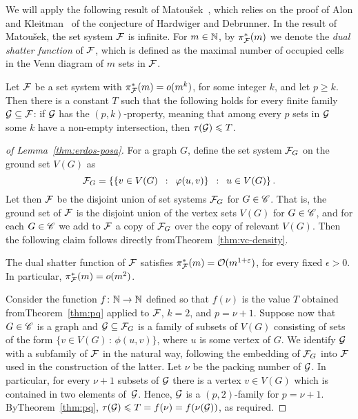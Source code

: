 We will apply the following result of Matou{\v s}ek~\cite{Matousek:2004:BVI:1005787.1005789},
which relies on the proof of Alon and Kleitman~\cite{ALON1992103} of the conjecture of Hardwiger and Debrunner. 
In the result of Matou{\v s}ek, the set system $\cal F$ is infinite. For $m\in \N$, by $\pi_{\cal F}^*(m)$ we denote the \emph{dual shatter function} of $\cal F$, which is defined as the maximal number 
of occupied cells in the Venn diagram of $m$ sets in $\cal F$.


\begin{theorem}\label{thm:pq}
	Let $\cal F$ be a set system with $\pi^*_{\cal F}(m)=o(m^k)$,
	for some integer $k$, and let $p\ge k$.
	Then there is a constant $T$ such that the following holds for every finite family $\cal G\subset \cal F$: 
	if $\cal G$ has the $(p,k)$-property, meaning that 
	among every $p$ sets in $\cal G$ some $k$ have a non-empty intersection, then $\tau ({\cal G})\le T$.
\end{theorem}
\begin{proof}[of Lemma~\ref{thm:erdos-posa}]
For a graph $G$, define the set system ${\cal F}_G$ on the ground set $V(G)$ as
$${\cal F}_G = \setof{\setof{v\in V(G)}{\phi(u, v)}}{u\in V(G)}.$$
Let then $\cal F$ be the disjoint union of set systems ${\cal F}_G$ for $G\in \CCC$. That is, 
the ground set of $\cal F$ is the disjoint union of the vertex sets $V(G)$ for $G\in \CCC$, and for each $G\in \CCC$ we add to ${\cal F}$
a copy of ${\cal F}_G$ over the copy of relevant $V(G)$.
Then the following claim follows directly fromTheorem~\ref{thm:vc-density}.

\begin{claim}
The dual shatter function of $\cal F$ satisfies $\pi^*_{\cal F}(m)=\Oof(m^{1+\epsilon})$,
for every fixed $\epsilon>0$. In particular, $\pi^*_{\cal F}(m)=o(m^{2})$.
\end{claim}

Consider the function $f\from \N \to \N$ defined so that $f(\nu)$ is the value $T$ obtained fromTheorem~\ref{thm:pq} applied to $\cal F$, $k=2$, and $p=\nu+1$.
Suppose now that $G\in \CCC$ is a graph and $\GGG\subseteq \FFF_G$
is a family of subsets of $V(G)$ consisting of sets of the form $\{v\in V(G)\,\colon\,\phi(u,v)\}$, where $u$ is some vertex of $G$.
We identify $\GGG$ with a subfamily of $\FFF$ in the natural way, following the embedding of $\FFF_G$ into $\FFF$ used in the construction of the latter.
Let $\nu$ be the packing number of $\GGG$.
In particular, for every $\nu+1$ subsets of $\GGG$
there is a vertex $v\in V(G)$
which is contained in two elements of~$\GGG$.
Hence, $\GGG$ is a $(p,2)$-family for $p=\nu+1$.
ByTheorem~\ref{thm:pq}, $\tau(\GGG)\le T=f(\nu)=f(\nu(\GGG))$, as required.
\end{proof}
